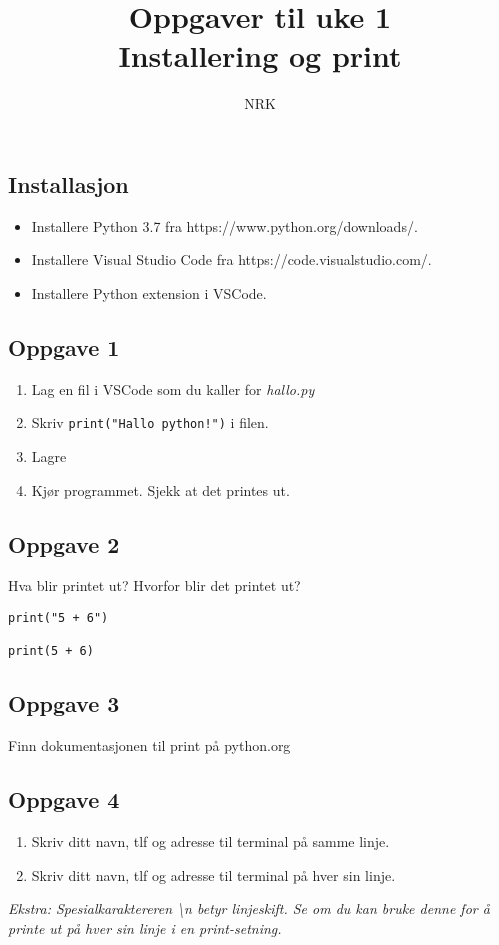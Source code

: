 \documentclass{article}
\title{Oppgaver til uke 1 \\ Installering og print}
\date{}
\author{NRK}
\begin{document}
\maketitle
\noindent

\subsection*{Installasjon}
\begin{itemize}
    \item Installere Python 3.7 fra https://www.python.org/downloads/.
    \item Installere Visual Studio Code fra https://code.visualstudio.com/.
    \item Installere Python extension i VSCode.
\end{itemize}


\subsection*{Oppgave 1}
\begin{enumerate}
    \item Lag en fil i VSCode som du kaller for \textit{hallo.py}
    \item Skriv \texttt{print("Hallo python!")} i filen.
    \item Lagre
    \item Kjør programmet. Sjekk at det printes ut.
\end{enumerate}


\subsection*{Oppgave 2}
Hva blir printet ut? Hvorfor blir det printet ut?

\begin{verbatim}
print("5 + 6")

print(5 + 6)
\end{verbatim}


\subsection*{Oppgave 3}
Finn dokumentasjonen til print på python.org 

\subsection*{Oppgave 4}
\begin{enumerate}
    \item Skriv ditt navn, tlf og adresse til terminal på samme linje.
    \item Skriv ditt navn, tlf og adresse til terminal på hver sin linje.
\end{enumerate}
 \noindent
\textit{Ekstra: Spesialkaraktereren \textbackslash n betyr linjeskift. Se om du kan bruke denne for å printe ut på hver sin linje i en print-setning.}
\end{document}
